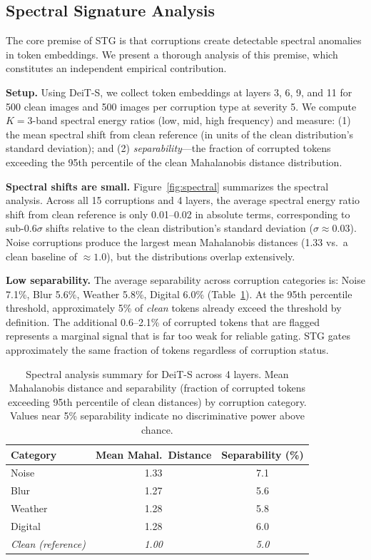 \documentclass{article}
\newcommand{\methodname}{STG}
\begin{document}
\subsection{Spectral Signature Analysis}
\label{sec:spectral}

The core premise of \methodname{} is that corruptions create detectable spectral anomalies in token embeddings. We present a thorough analysis of this premise, which constitutes an independent empirical contribution.

\textbf{Setup.} Using DeiT-S, we collect token embeddings at layers 3, 6, 9, and 11 for 500 clean images and 500 images per corruption type at severity 5. We compute $K{=}3$-band spectral energy ratios (low, mid, high frequency) and measure: (1) the mean spectral shift from clean reference (in units of the clean distribution's standard deviation); and (2) \emph{separability}---the fraction of corrupted tokens exceeding the 95th percentile of the clean Mahalanobis distance distribution.

\textbf{Spectral shifts are small.} Figure~\ref{fig:spectral} summarizes the spectral analysis. Across all 15 corruptions and 4 layers, the average spectral energy ratio shift from clean reference is only 0.01--0.02 in absolute terms, corresponding to sub-$0.6\sigma$ shifts relative to the clean distribution's standard deviation ($\sigma \approx 0.03$). Noise corruptions produce the largest mean Mahalanobis distances (1.33 vs.\ a clean baseline of ${\approx}1.0$), but the distributions overlap extensively.

\textbf{Low separability.} The average separability across corruption categories is: Noise 7.1\%, Blur 5.6\%, Weather 5.8\%, Digital 6.0\% (Table~\ref{tab:spectral_summary}). At the 95th percentile threshold, approximately 5\% of \emph{clean} tokens already exceed the threshold by definition. The additional 0.6--2.1\% of corrupted tokens that are flagged represents a marginal signal that is far too weak for reliable gating. \methodname{} gates approximately the same fraction of tokens regardless of corruption status.

\begin{table}[t]
\centering
\caption{Spectral analysis summary for DeiT-S across 4 layers. Mean Mahalanobis distance and separability (fraction of corrupted tokens exceeding 95th percentile of clean distances) by corruption category. Values near 5\% separability indicate no discriminative power above chance.}
\label{tab:spectral_summary}
\begin{tabular}{lcc}
\toprule
Category & Mean Mahal.\ Distance & Separability (\%) \\
\midrule
Noise & 1.33 & 7.1 \\
Blur & 1.27 & 5.6 \\
Weather & 1.28 & 5.8 \\
Digital & 1.28 & 6.0 \\
\midrule
\emph{Clean (reference)} & \emph{1.00} & \emph{5.0} \\
\bottomrule
\end{tabular}
\end{table}
\end{document}
